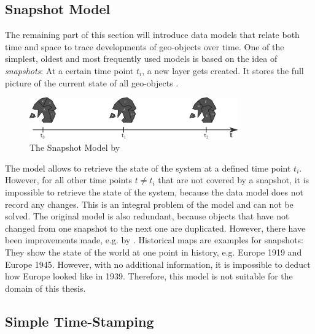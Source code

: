


\subsection{Snapshot Model} %
\label{sub:snapshot_model}

The remaining part of this section will introduce data models that relate both time and space to trace developments of geo-objects over time. One of the simplest, oldest and most frequently used models is based on the idea of \emph{snapshots}: At a certain time point $t_i$, a new layer gets created. It stores the full picture of the current state of all geo-objects
\cite{Langran1988frameworktgis}.

\begin{figure}[H]
  \centering
  \includegraphics[width=0.8\textwidth]{graphics/basics/stdm/snapshot_model}
  \caption{The Snapshot Model by \cite{Langran1988frameworktgis}}
  \label{fig:snapshot_model}
\end{figure}

The model allows to retrieve the state of the system at a defined time point $t_i$. However, for all other time points $t \neq t_i$ that are not covered by a snapshot, it is impossible to retrieve the state of the system, because the data model does not record any changes. This is an integral problem of the model and can not be solved. The original model is also redundant, because objects that have not changed from one snapshot to the next one are duplicated. However, there have been improvements made, e.g. by \cite{armenakis92}.
Historical maps are examples for snapshots: They show the state of the world at one point in history, e.g. Europe 1919 and Europe 1945. However, with no additional information, it is impossible to deduct how Europe looked like in 1939. Therefore, this model is not suitable for the domain of this thesis.


\subsection{Simple Time-Stamping} %
\label{sub:simple_time_stamping}


